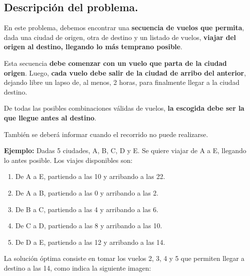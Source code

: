 \subsection{Descripción del problema.}

\vspace*{0.3cm}

En este problema, debemos encontrar una \textbf{secuencia de vuelos que
permita}, dada una ciudad de origen, otra de destino y un listado de vuelos,
\textbf{viajar del origen al destino, llegando lo más temprano posible}.

Esta secuencia \textbf{debe comenzar con un vuelo que parta de la ciudad
origen}. Luego, \textbf{cada vuelo debe salir de la ciudad de arribo del
anterior}, dejando libre un lapso de, al menos, 2 horas, para finalmente
llegar a la ciudad destino.

De todas las posibles combinaciones válidas de vuelos, \textbf{la escogida
debe ser la que llegue antes al destino}.

También se deberá informar cuando el recorrido no puede realizarse.

\vspace*{0.5cm}

\textbf{Ejemplo:}
Dadas 5 ciudades, A, B, C, D y E. Se quiere viajar de A a E, llegando lo
antes posible.
Los viajes disponibles son:

\begin{enumerate}
  \item De A a E, partiendo a las 10 y arribando a las 22.

  \item De A a B, partiendo a las 0 y arribando a las 2.

  \item De B a C, partiendo a las 4 y arribando a las 6.

  \item De C a D, partiendo a las 8 y arribando a las 10.

  \item De D a E, partiendo a las 12 y arribando a las 14.
\end{enumerate}

La solución óptima consiste en tomar los vuelos 2, 3, 4 y 5 que permiten
llegar a destino a las 14, como indica la siguiente imagen:

